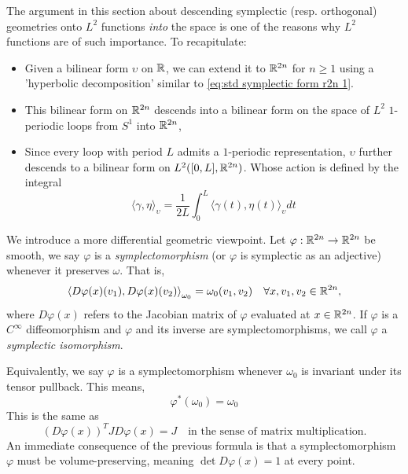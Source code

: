 \documentclass[../main-v2-manifolds.tex]{subfiles}
\begin{document}
%
%
%
%
%
%
\begin{remark}
    The argument in this section about descending symplectic (resp. orthogonal) geometries onto $L^2$ functions \emph{into} the space is one of the reasons why $L^2$ functions are of such importance. To recapitulate:
    \begin{itemize}
        \item Given a bilinear form $\upsilon$ on $\mathbb{R}$, we can extend it to ${\mathbb{R}^{2n}}$ for $n\geq 1$ using a 'hyperbolic decomposition' similar to \cref{eq:std symplectic form r2n 1}.
        \item This bilinear form on ${\mathbb{R}^{2n}}$ descends into a bilinear form on the space of $L^2$ $1$-periodic loops from $S^1$ into ${\mathbb{R}^{2n}}$,
        \item Since every loop with period $L$ admits a $1$-periodic representation, $\upsilon$ further descends to a bilinear form on $L^2([0,L], {\mathbb{R}^{2n}})$. Whose action is defined by the integral
        \[
            \langle \gamma,\eta\rangle_{\upsilon} = \frac{1}{2L}\int_{0}^{L}\langle\gamma(t),\eta(t)\rangle_{\upsilon}dt
        \]
    \end{itemize}
\end{remark}
We introduce a more differential geometric viewpoint. Let $\varphi:{\mathbb{R}^{2n}}\to{\mathbb{R}^{2n}}$ be smooth, we say $\varphi$ is a \emph{symplectomorphism} (or $\varphi$ is symplectic as an adjective) whenever it preserves $\omega$. That is,
\[
    \left\langle D\varphi(x)(v_1), D\varphi(x)(v_2)\right\rangle_{\omega_0} = \omega_0(v_1, v_2)\quad\forall x,v_1,v_2\in{\mathbb{R}^{2n}},
\]
where $D\varphi(x)$ refers to the Jacobian matrix of $\varphi$ evaluated at $x\in{\mathbb{R}^{2n}}$. If $\varphi$ is a $C^\infty$ diffeomorphism and $\varphi$ and its inverse are symplectomorphisms, we call $\varphi$ a \emph{symplectic isomorphism}. 
%
\begin{remark}
    Equivalently, we say $\varphi$ is a symplectomorphism whenever $\omega_0$ is invariant under its tensor pullback. This means, 
    \begin{equation}
        \varphi^*(\omega_0) =\omega_0
        \label{eq:symplectomorphism tensor pullback}
    \end{equation}
    This is the same as
    \[
        (D\varphi(x))^{T}J D\varphi(x) = J\quad\text{in the sense of matrix multiplication.}
    \]
    An immediate consequence of the previous formula is that a symplectomorphism $\varphi$ must be volume-preserving, meaning $\det D\varphi(x) = 1$ at every point.
\end{remark}
\end{document}
